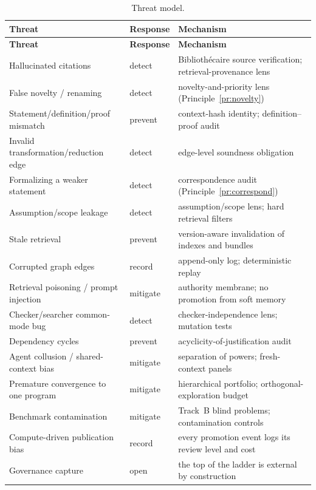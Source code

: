 \documentclass[11pt]{amsart}
\theoremstyle{definition}
\theoremstyle{remark}
\begin{document}
{\footnotesize
\begin{longtable}{@{}p{}p{}p{}@{}}
\caption{Threat model.}\label{tab:threats}\\
\toprule
\textbf{Threat} & \textbf{Response} & \textbf{Mechanism}\\ \midrule
\endfirsthead
\toprule \textbf{Threat} & \textbf{Response} & \textbf{Mechanism}\\ \midrule
\endhead
Hallucinated citations & detect & Biblioth\'ecaire source verification;
retrieval-provenance lens\\
False novelty / renaming & detect & novelty-and-priority lens
(Principle~\ref{pr:novelty})\\
Statement/definition/proof mismatch & prevent & context-hash identity;
definition--proof audit\\
Invalid transformation/reduction edge & detect & edge-level soundness obligation\\
Formalizing a weaker statement & detect & correspondence audit
(Principle~\ref{pr:correspond})\\
Assumption/scope leakage & detect & assumption/scope lens; hard retrieval filters\\
Stale retrieval & prevent & version-aware invalidation of indexes and bundles\\
Corrupted graph edges & record & append-only log; deterministic replay\\
Retrieval poisoning / prompt injection & mitigate & authority membrane; no
promotion from soft memory\\
Checker/searcher common-mode bug & detect & checker-independence lens; mutation
tests\\
Dependency cycles & prevent & acyclicity-of-justification audit\\
Agent collusion / shared-context bias & mitigate & separation of powers;
fresh-context panels\\
Premature convergence to one program & mitigate & hierarchical portfolio;
orthogonal-exploration budget\\
Benchmark contamination & mitigate & Track~B blind problems; contamination
controls\\
Compute-driven publication bias & record & every promotion event logs its
review level and cost\\
Governance capture & open & the top of the ladder is external by construction\\
\bottomrule
\end{longtable}
}
\end{document}
